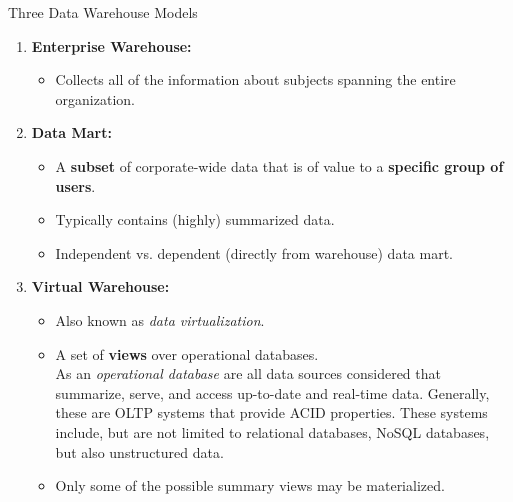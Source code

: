 \begin{frame}{Three Data Warehouse Models}
	\begin{enumerate}
		\item \textbf{\color{airforceblue}Enterprise Warehouse:}
		      \begin{itemize}
			      \item Collects all of the information about subjects spanning the entire organization.
		      \end{itemize}
		\item \textbf{\color{airforceblue}Data Mart:}
		      \begin{itemize}
			      \item A \textbf{\color{airforceblue}subset} of corporate-wide data that is of value to a \textbf{\color{airforceblue}specific group of users}.
			      \item Typically contains (highly) summarized data.
			      \item Independent vs. dependent (directly from warehouse) data mart.
		      \end{itemize}
		\item \textbf{\color{airforceblue}Virtual Warehouse:}
		      \begin{itemize}
			      \item Also known as \textit{data virtualization}.
			      \item A set of \textbf{\color{airforceblue}views} over operational databases.\\
			            {\scriptsize As an \textit{operational database} are all data sources considered that summarize, serve, and access up-to-date and real-time data. Generally, these are OLTP systems that provide ACID properties. These systems include, but are not limited to relational databases, NoSQL databases, but also unstructured data.}
			      \item Only some of the possible summary views may be materialized.
		      \end{itemize}
	\end{enumerate}
\end{frame}

